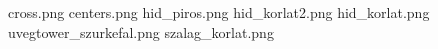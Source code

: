 cross.png
centers.png
hid_piros.png
hid_korlat2.png
hid_korlat.png
uvegtower_szurkefal.png
szalag_korlat.png
